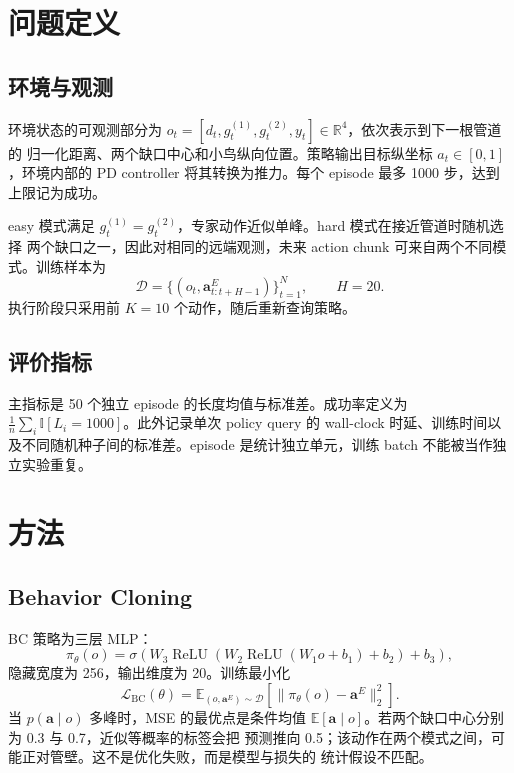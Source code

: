 \documentclass[10pt,twocolumn,a4paper]{ctexart}
\begin{document}
\section{问题定义}
\subsection{环境与观测}
环境状态的可观测部分为
$o_t=[d_t,g_t^{(1)},g_t^{(2)},y_t]\in\mathbb{R}^{4}$，依次表示到下一根管道的
归一化距离、两个缺口中心和小鸟纵向位置。策略输出目标纵坐标
$a_t\in[0,1]$，环境内部的 PD controller 将其转换为推力。每个 episode 最多 1000
步，达到上限记为成功。

easy 模式满足 $g_t^{(1)}=g_t^{(2)}$，专家动作近似单峰。hard 模式在接近管道时随机选择
两个缺口之一，因此对相同的远端观测，未来 action chunk 可来自两个不同模式。训练样本为
\[
  \mathcal{D}=\{(o_t,\bm a_{t:t+H-1}^{E})\}_{t=1}^{N},\qquad H=20.
\]
执行阶段只采用前 $K=10$ 个动作，随后重新查询策略。

\subsection{评价指标}
主指标是 50 个独立 episode 的长度均值与标准差。成功率定义为
$\frac{1}{n}\sum_i\mathbb{I}[L_i=1000]$。此外记录单次 policy query 的 wall-clock
时延、训练时间以及不同随机种子间的标准差。episode 是统计独立单元，训练 batch
不能被当作独立实验重复。

\section{方法}
\subsection{Behavior Cloning}
BC 策略为三层 MLP：
\[
  \pi_\theta(o)=\sigma\!\left(
  W_3\operatorname{ReLU}(W_2\operatorname{ReLU}(W_1o+b_1)+b_2)+b_3
  \right),
\]
隐藏宽度为 256，输出维度为 20。训练最小化
\[
  \mathcal{L}_{\mathrm{BC}}(\theta)=
  \mathbb{E}_{(o,\bm a^E)\sim\mathcal D}
  \left[\|\pi_\theta(o)-\bm a^E\|_2^2\right].
\]
当 $p(\bm a\mid o)$ 多峰时，MSE 的最优点是条件均值
$\mathbb E[\bm a\mid o]$。若两个缺口中心分别为 0.3 与 0.7，近似等概率的标签会把
预测推向 0.5；该动作在两个模式之间，可能正对管壁。这不是优化失败，而是模型与损失的
统计假设不匹配。
\end{document}
